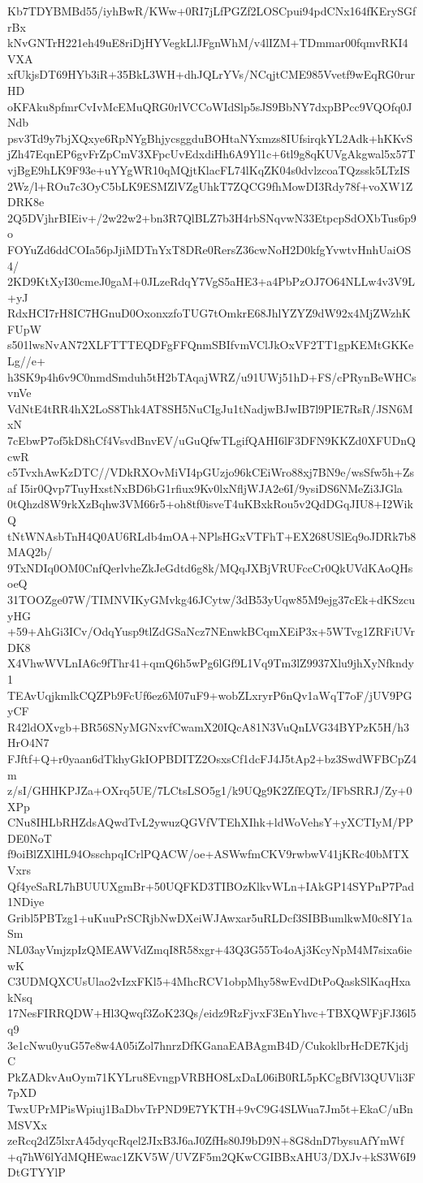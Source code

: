 Kb7TDYBMBd55/iyhBwR/KWw+0RI7jLfPGZf2LOSCpui94pdCNx164fKErySGfrBx
kNvGNTrH221eh49uE8riDjHYVegkLlJFgnWhM/v4lIZM+TDmmar00fqmvRKI4VXA
xfUkjsDT69HYb3iR+35BkL3WH+dhJQLrYVs/NCqjtCME985Vvetf9wEqRG0rurHD
oKFAku8pfmrCvIvMcEMuQRG0rlVCCoWIdSlp5sJS9BbNY7dxpBPcc9VQOfq0JNdb
psv3Td9y7bjXQxye6RpNYgBhjycsggduBOHtaNYxmzs8IUfsirqkYL2Adk+hKKvS
jZh47EqnEP6gvFrZpCmV3XFpcUvEdxdiHh6A9Yl1c+6tl9g8qKUVgAkgwal5x57T
vjBgE9hLK9F93e+uYYgWR10qMQjtKlacFL74lKqZK04s0dvlzcoaTQzssk5LTzIS
2Wz/l+ROu7c3OyC5bLK9ESMZlVZgUhkT7ZQCG9fhMowDI3Rdy78f+voXW1ZDRK8e
2Q5DVjhrBIEiv+/2w22w2+bn3R7QlBLZ7b3H4rbSNqvwN33EtpcpSdOXbTus6p9o
FOYuZd6ddCOIa56pJjiMDTnYxT8DRe0RersZ36cwNoH2D0kfgYvwtvHnhUaiOS4/
2KD9KtXyI30cmeJ0gaM+0JLzeRdqY7VgS5aHE3+a4PbPzOJ7O64NLLw4v3V9L+yJ
RdxHCI7rH8IC7HGnuD0OxonxzfoTUG7tOmkrE68JhlYZYZ9dW92x4MjZWzhKFUpW
s501lwsNvAN72XLFTTTEQDFgFFQnmSBIfvmVClJkOxVF2TT1gpKEMtGKKeLg//e+
h3SK9p4h6v9C0nmdSmduh5tH2bTAqajWRZ/u91UWj51hD+FS/cPRynBeWHCsvnVe
VdNtE4tRR4hX2LoS8Thk4AT8SH5NuCIgJu1tNadjwBJwIB7l9PIE7RsR/JSN6MxN
7cEbwP7of5kD8hCf4VsvdBnvEV/uGuQfwTLgifQAHI6lF3DFN9KKZd0XFUDnQcwR
c5TvxhAwKzDTC//VDkRXOvMiVI4pGUzjo96kCEiWro88xj7BN9e/wsSfw5h+Zsaf
I5ir0Qvp7TuyHxstNxBD6bG1rfiux9Kv0lxNfljWJA2e6I/9ysiDS6NMeZi3JGla
0tQhzd8W9rkXzBqhw3VM66r5+oh8tf0isveT4uKBxkRou5v2QdDGqJIU8+I2WikQ
tNtWNAsbTnH4Q0AU6RLdb4mOA+NPlsHGxVTFhT+EX268USlEq9oJDRk7b8MAQ2b/
9TxNDIq0OM0CnfQerlvheZkJeGdtd6g8k/MQqJXBjVRUFccCr0QkUVdKAoQHsoeQ
31TOOZge07W/TIMNVIKyGMvkg46JCytw/3dB53yUqw85M9ejg37cEk+dKSzcuyHG
+59+AhGi3ICv/OdqYusp9tlZdGSaNcz7NEnwkBCqmXEiP3x+5WTvg1ZRFiUVrDK8
X4VhwWVLnIA6c9fThr41+qmQ6h5wPg6lGf9L1Vq9Tm3lZ9937Xlu9jhXyNfkndy1
TEAvUqjkmlkCQZPb9FcUf6ez6M07uF9+wobZLxryrP6nQv1aWqT7oF/jUV9PGyCF
R42ldOXvgb+BR56SNyMGNxvfCwamX20IQcA81N3VuQnLVG34BYPzK5H/h3HrO4N7
FJftf+Q+r0yaan6dTkhyGkIOPBDITZ2OsxsCf1dcFJ4J5tAp2+bz3SwdWFBCpZ4m
z/sI/GHHKPJZa+OXrq5UE/7LCtsLSO5g1/k9UQg9K2ZfEQTz/IFbSRRJ/Zy+0XPp
CNu8IHLbRHZdsAQwdTvL2ywuzQGVfVTEhXIhk+ldWoVehsY+yXCTIyM/PPDE0NoT
f9oiBlZXlHL94OsschpqICrlPQACW/oe+ASWwfmCKV9rwbwV41jKRc40bMTXVxrs
Qf4yeSaRL7hBUUUXgmBr+50UQFKD3TIBOzKlkvWLn+IAkGP14SYPnP7Pad1NDiye
Gribl5PBTzg1+uKuuPrSCRjbNwDXeiWJAwxar5uRLDcf3SIBBumlkwM0c8IY1aSm
NL03ayVmjzpIzQMEAWVdZmqI8R58xgr+43Q3G55To4oAj3KcyNpM4M7sixa6iewK
C3UDMQXCUsUlao2vIzxFKl5+4MhcRCV1obpMhy58wEvdDtPoQaskSlKaqHxakNsq
17NesFIRRQDW+Hl3Qwqf3ZoK23Qs/eidz9RzFjvxF3EnYhvc+TBXQWFjFJ36l5q9
3e1cNwu0yuG57e8w4A05iZol7hnrzDfKGanaEABAgmB4D/CukoklbrHcDE7KjdjC
PkZADkvAuOym71KYLru8EvngpVRBHO8LxDaL06iB0RL5pKCgBfVl3QUVli3F7pXD
TwxUPrMPisWpiuj1BaDbvTrPND9E7YKTH+9vC9G4SLWua7Jm5t+EkaC/uBnMSVXx
zeRcq2dZ5lxrA45dyqcRqel2JIxB3J6aJ0ZfHs80J9bD9N+8G8dnD7bysuAfYmWf
+q7hW6lYdMQHEwac1ZKV5W/UVZF5m2QKwCGIBBxAHU3/DXJv+kS3W6I9DtGTYYlP
